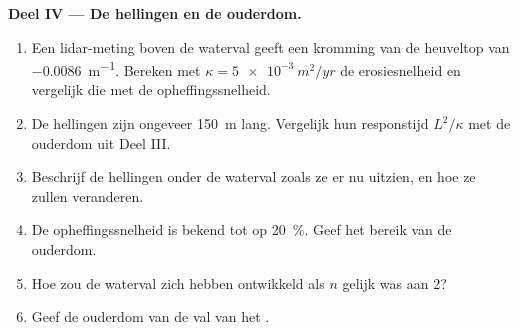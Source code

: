 \begin{problem}
\medskip\noindent\textbf{Deel IV --- De hellingen en de ouderdom.}
\begin{enumerate}[resume]
\item Een lidar-meting boven de waterval geeft een kromming van de heuveltop
  van \qty{-0.0086}{m^{-1}}. Bereken met $\kappa = \qty{5e-3}{m^2/yr}$ de
  erosiesnelheid en vergelijk die met de opheffingssnelheid.
\item De hellingen zijn ongeveer \qty{150}{m} lang. Vergelijk hun
  responstijd $L^2/\kappa$ met de ouderdom uit Deel III.
\item Beschrijf de hellingen onder de waterval zoals ze er nu uitzien, en hoe
  ze zullen veranderen.
\item De opheffingssnelheid is bekend tot op \qty{20}{\percent}. Geef het
  bereik van de ouderdom.
\item Hoe zou de waterval zich hebben ontwikkeld als $n$ gelijk was aan 2?
\item Geef de ouderdom van de val van het .
\end{enumerate}
\end{problem}
